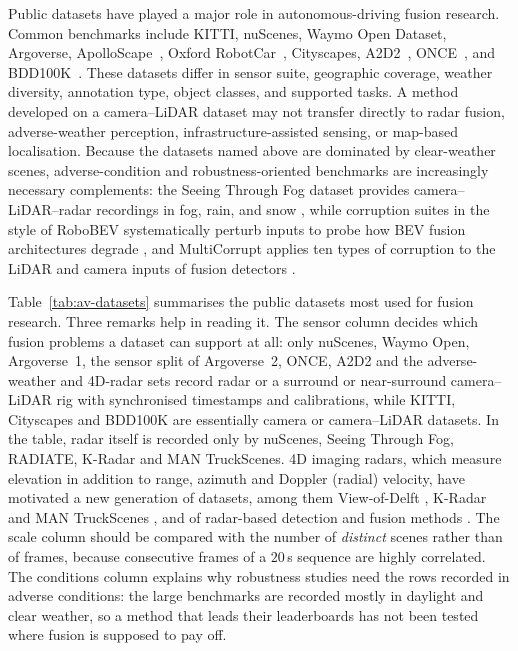 Public datasets have played a major role in autonomous-driving fusion research. Common benchmarks include KITTI, nuScenes, Waymo Open Dataset, Argoverse, ApolloScape~\cite{huang2020_apolloscape}, Oxford RobotCar~\cite{maddern2017_robotcar}, Cityscapes, A2D2~\cite{geyer2020_a2d2}, ONCE~\cite{mao2021_once}, and BDD100K~\cite{geiger2013_kitti,caesar2020_nuscenes,sun2020_waymo,chang2019_argoverse,cordts2016_cityscapes,yu2020_bdd100k}. These datasets differ in sensor suite, geographic coverage, weather diversity, annotation type, object classes, and supported tasks. A method developed on a camera--LiDAR dataset may not transfer directly to radar fusion, adverse-weather perception, infrastructure-assisted sensing, or map-based localisation. Because the datasets named above are dominated by clear-weather scenes, adverse-condition and robustness-oriented benchmarks are increasingly necessary complements: the Seeing Through Fog dataset provides camera--LiDAR--radar recordings in fog, rain, and snow \cite{bijelic2020_stf}, while corruption suites in the style of RoboBEV systematically perturb inputs to probe how BEV fusion architectures degrade \cite{dong2023_robobev}, and MultiCorrupt applies ten types of corruption to the LiDAR and camera inputs of fusion detectors \cite{beemelmanns2024_multicorrupt}.

Table~\ref{tab:av-datasets} summarises the public datasets most used for fusion research. Three remarks help in reading it. The sensor column decides which fusion problems a dataset can support at all: only nuScenes, Waymo Open, Argoverse~1, the sensor split of Argoverse~2, ONCE, A2D2 and the adverse-weather and 4D-radar sets record radar or a surround or near-surround camera--LiDAR rig with synchronised timestamps and calibrations, while KITTI, Cityscapes and BDD100K are essentially camera or camera--LiDAR datasets. In the table, radar itself is recorded only by nuScenes, Seeing Through Fog, RADIATE, K-Radar and MAN TruckScenes. 4D imaging radars, which measure elevation in addition to range, azimuth and Doppler (radial) velocity, have motivated a new generation of datasets, among them View-of-Delft \cite{palffy2022_vod}, K-Radar \cite{paek2022_kradar} and MAN TruckScenes \cite{fent2024_truckscenes}, and of radar-based detection and fusion methods \cite{fan2024_4dradar_survey}. The scale column should be compared with the number of \emph{distinct} scenes rather than of frames, because consecutive frames of a $20$\,s sequence are highly correlated. The conditions column explains why robustness studies need the rows recorded in adverse conditions: the large benchmarks are recorded mostly in daylight and clear weather, so a method that leads their leaderboards has not been tested where fusion is supposed to pay off.

